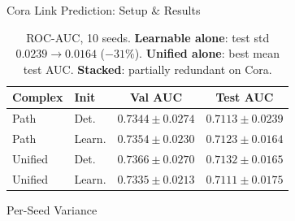 \documentclass[final]{beamer}
\newlength{\colwidth}
\begin{document}
\begin{frame}[t]
\begin{columns}[t]
\begin{column}{\colwidth}
\begin{block}{Cora Link Prediction: Setup \& Results}
        \medskip
        \begin{table}
          \centering
          \begin{tabular}{l l c c}
            \toprule
            \textbf{Complex} & \textbf{Init} & \textbf{Val AUC} & \textbf{Test AUC} \\
            \midrule
            Path    & Det.   & $0.7344 \pm 0.0274$ & $0.7113 \pm 0.0239$ \\
            Path    & Learn. & $0.7354 \pm 0.0230$ & $0.7123 \pm 0.0164$ \\
            Unified & Det.   & $\mathbf{0.7366 \pm 0.0270}$ & $\mathbf{0.7132 \pm 0.0165}$ \\
            Unified & Learn. & $0.7335 \pm 0.0213$ & $0.7111 \pm 0.0175$ \\
            \bottomrule
          \end{tabular}
          \caption{ROC-AUC, 10 seeds. \textbf{Learnable alone}: test std
            $0.0239\!\to\!0.0164$ ($-31\%$). \textbf{Unified alone}: best
          mean test AUC. \textbf{Stacked}: partially redundant on Cora.}
          \label{tab:ablation}
        \end{table}

      \end{block}

      \medskip

      \begin{block}{Per-Seed Variance}


\end{block}
\end{column}
\end{columns}
\end{frame}
\end{document}
